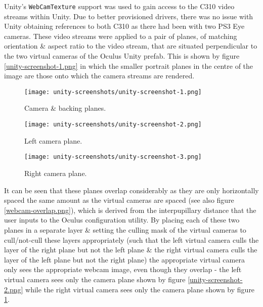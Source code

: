 Unity's \texttt{WebCamTexture} support was used to gain access to the C310 video streams within Unity. Due to better provisioned drivers, there was no issue with Unity obtaining references to both C310 as there had been with two PS3 Eye cameras. These video streams were applied to a pair of planes, of matching orientation \& aspect ratio to the video stream, that are situated perpendicular to the two virtual cameras of the Oculus Unity prefab. This is shown by figure \ref{unity-screenshot-1.png} in which the smaller portrait planes in the centre of the image are those onto which the camera streams are rendered.

\begin{figure}[h]
    \begin{center}
    \begin{minipage}[t]{.32\textwidth}
        \begin{center}
        \texttt{[image: unity-screenshots/unity-screenshot-1.png]}
        \caption{Camera \& backing planes.}
        \label{unity-screenshot-1.png}
        \end{center}
    \end{minipage}%
    \hspace{.01\textwidth}
    \begin{minipage}[t]{.32\textwidth}
		\begin{center}
        \texttt{[image: unity-screenshots/unity-screenshot-2.png]}
        \caption{Left camera plane.}
        \label{unity-screenshot-2.png}
        \end{center}
    \end{minipage}%
    \hspace{.01\textwidth}
    \begin{minipage}[t]{.32\textwidth}
        \begin{center}
        \texttt{[image: unity-screenshots/unity-screenshot-3.png]}
        \caption{Right camera plane.}
        \label{unity-screenshot-3.png}
        \end{center}
    \end{minipage}
    \end{center}
\end{figure}

It can be seen that these planes overlap considerably as they are only horizontally spaced the same amount as the virtual cameras are spaced (see also figure \ref{webcam-overlap.png}), which is derived from the interpupillary distance that the user inputs to the Oculus configuration utility. By placing each of these two planes in a separate layer \& setting the culling mask of the virtual cameras to cull/not-cull these layers appropriately (such that the left virtual camera culls the layer of the right plane but not the left plane \& the right virtual camera culls the layer of the left plane but not the right plane) the appropriate virtual camera only sees the appropriate webcam image, even though they overlap - the left virtual camera sees only the camera plane shown by figure \ref{unity-screenshot-2.png} while the right virtual camera sees only the camera plane shown by figure \ref{unity-screenshot-3.png}.

